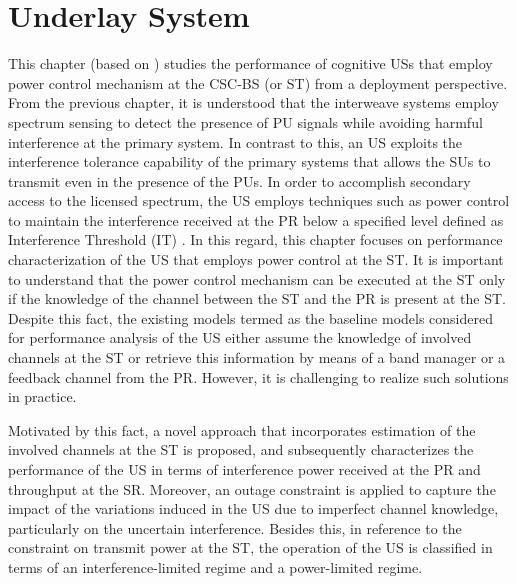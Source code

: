 \chapter{Underlay System}
\label{chap:US}

This chapter (based on ) studies the performance of cognitive USs that employ power control mechanism at the CSC-BS (or ST) from a deployment perspective. 
From the previous chapter, it is understood that the interweave systems employ spectrum sensing to detect the presence of PU signals while avoiding harmful interference at the primary system. In contrast to this, an US exploits the interference tolerance capability of the primary systems that allows the SUs to transmit even in the presence of the PUs. In order to accomplish secondary access to the licensed spectrum, the US employs techniques such as power control to maintain the interference received at the PR below a specified level defined as Interference Threshold (IT) \cite{Xing07}. In this regard, this chapter focuses on performance characterization of the US that employs power control at the ST. It is important to understand that the power control mechanism can be executed at the ST only if the knowledge of the channel between the ST and the PR is present at the ST. Despite this fact, the existing models termed as the baseline models considered for performance analysis of the US either assume the knowledge of involved channels at the ST or retrieve this information by means of a band manager or a feedback channel from the PR. However, it is challenging to realize such solutions in practice. 

Motivated by this fact, a novel approach that incorporates estimation of the involved channels at the ST is proposed, and subsequently characterizes the performance of the US in terms of interference power received at the PR and throughput at the SR. Moreover, an outage constraint is applied to capture the impact of the variations induced in the US due to imperfect channel knowledge, particularly on the uncertain interference. Besides this, in reference to the constraint on transmit power at the ST, the operation of the US is classified in terms of an interference-limited regime and a power-limited regime. 

